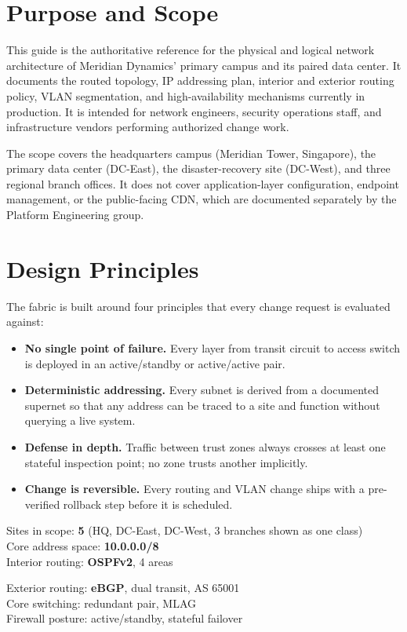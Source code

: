 \documentclass[11pt,a4paper]{report}
\begin{document}
\section{Purpose and Scope}
This guide is the authoritative reference for the physical and logical network architecture
of Meridian Dynamics' primary campus and its paired data center. It documents the routed
topology, IP addressing plan, interior and exterior routing policy, VLAN segmentation, and
high-availability mechanisms currently in production. It is intended for network engineers,
security operations staff, and infrastructure vendors performing authorized change work.

The scope covers the headquarters campus (Meridian Tower, Singapore), the primary data
center (DC-East), the disaster-recovery site (DC-West), and three regional branch offices.
It does not cover application-layer configuration, endpoint management, or the public-facing
CDN, which are documented separately by the Platform Engineering group.

\section{Design Principles}
The fabric is built around four principles that every change request is evaluated against:

\begin{itemize}[leftmargin=1.4em]
  \item \textbf{No single point of failure.} Every layer from transit circuit to access
    switch is deployed in an active/standby or active/active pair.
  \item \textbf{Deterministic addressing.} Every subnet is derived from a documented
    supernet so that any address can be traced to a site and function without querying
    a live system.
  \item \textbf{Defense in depth.} Traffic between trust zones always crosses at least one
    stateful inspection point; no zone trusts another implicitly.
  \item \textbf{Change is reversible.} Every routing and VLAN change ships with a
    pre-verified rollback step before it is scheduled.
\end{itemize}

\begin{factbox}
\begin{minipage}[t]{0.48\linewidth}
Sites in scope: \textbf{5} (HQ, DC-East, DC-West, 3 branches shown as one class)\\
Core address space: \textbf{10.0.0.0/8}\\
Interior routing: \textbf{OSPFv2}, 4 areas
\end{minipage}\hfill
\begin{minipage}[t]{0.48\linewidth}
Exterior routing: \textbf{eBGP}, dual transit, AS 65001\\
Core switching: redundant pair, MLAG\\
Firewall posture: active/standby, stateful failover
\end{minipage}
\end{factbox}
\end{document}
